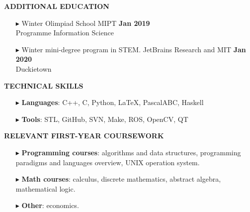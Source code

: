 \documentclass[a4paper,10pt]{article}
\begin{document}
	\colorbox{magicmint}{
		\begin{minipage}{0.96\textwidth}
			\textbf{ADDITIONAL EDUCATION}
		\end{minipage}
	}
	
	\begin{itemize}
		\item[$\blacktriangleright$]  Winter Olimpiad School MIPT \hspace{10.4cm}\textbf{Jan 2019} \\ Programme Information Science 
		\item[$\blacktriangleright$]  Winter mini-degree program in STEM. JetBrains Research and MIT \hspace{4.7cm}\textbf{Jan 2020} \\ Duckietown
	\end{itemize}
	
	\colorbox{magicmint}{
		\begin{minipage}{0.96\textwidth}
			\textbf{TECHNICAL SKILLS}
		\end{minipage}
	}
	\begin{itemize}
		\item [$\blacktriangleright$]  \textbf{Languages}: C++, C, Python, \LaTeX, PascalABC, Haskell
		\item [$\blacktriangleright$]  \textbf{Tools}: STL, GitHub, SVN, Make, ROS, OpenCV, QT
	\end{itemize}
	
	\colorbox{magicmint}{
		\begin{minipage}{0.96\textwidth}
			\textbf{RELEVANT FIRST-YEAR COURSEWORK}
		\end{minipage}
	}
	\begin{itemize}
		\item [$\blacktriangleright$]{
			\textbf{Programming courses}{: algorithms and data structures, programming paradigms and languages overview, UNIX operation system.}
		}
		\item [$\blacktriangleright$] {
			\textbf{Math courses}{: calculus, discrete mathematics, abstract algebra, mathematical logic.}
		}
		\item [$\blacktriangleright$] {
			\textbf{Other}{: economics.}
		}
	\end{itemize}
\end{document}
